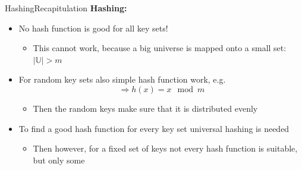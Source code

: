 

\begin{frame}{Hashing}{Recapitulation}
  \textbf{Hashing:}
  \begin{itemize}   
  \item<2->
    No hash function is good for all key sets!\\
    \begin{itemize}
    \item<3->
      This cannot work, because a big universe
      is mapped onto a small set: {\color{MainA}$\vert \mathbb{U} \vert > m$}
    \end{itemize}
  \item<4->
    For random key sets also simple hash function work, e.g.
     {\color{MainA}\[\Rightarrow h(x) = x \mod m\]}\vspace*{-2em}
     \begin{itemize}
    \item<5->
      Then the random keys make sure that it is distributed evenly
     \end{itemize}
  \item<6->
   To find a good hash function for every key set universal hashing is needed
     \begin{itemize}
    \item<7->
      Then however, for a fixed set of keys not every hash function is suitable,
      but only some
    \end{itemize}
  \end{itemize}
\end{frame}


